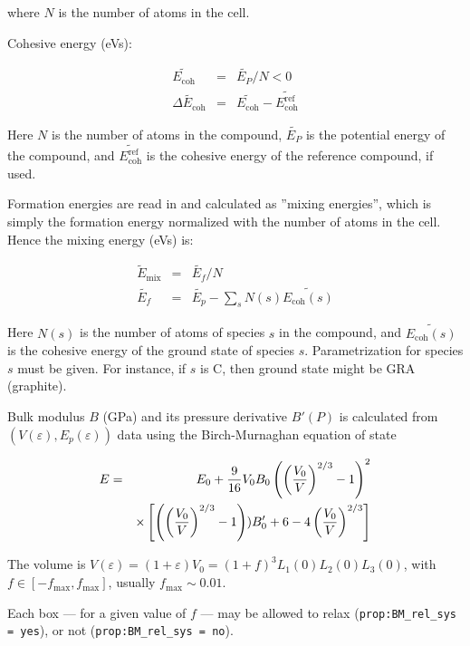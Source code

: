 \documentclass[a4paper,12pt,pdftex,onecolumn]{article}
\begin{document}
where $N$ is the number of atoms in the cell.

Cohesive energy (eVs):

\begin{eqnarray}
\widetilde{E_{\mathrm{coh}}} &=& \widetilde{E_P}/N < 0\\
\widetilde{\Delta E_{\mathrm{coh}}}
&=& \widetilde{E_{\mathrm{coh}}} - \widetilde{E_{\mathrm{coh}}^{\mathrm{ref}}}
\end{eqnarray}

Here $N$ is the number of atoms in the compound,
$\widetilde{E_P}$ is the potential energy of the compound, and
$\widetilde{E_{\mathrm{coh}}^{\mathrm{ref}}}$ is the cohesive energy of the reference
compound, if used.

Formation energies are read in and calculated as ''mixing energies'',
which is simply the formation energy normalized with the number of atoms
in the cell. Hence the mixing energy (eVs) is:

\begin{eqnarray}
\widetilde{E}_{\mathrm{mix}} &=& \widetilde{E_f}/N \\
\widetilde{E_f} &=& \widetilde{E_p} - \sum_s N(s) \widetilde{E_{\mathrm{coh}}(s)}
\end{eqnarray}

Here $N(s)$ is the number of atoms of species $s$ in the compound, and
$\widetilde{E_{\mathrm{coh}}(s)}$ is the cohesive energy of the ground state of species $s$.
Parametrization for species $s$ must be given.
For instance, if $s$ is C, then ground state might be GRA (graphite).


Bulk modulus $B$ (GPa) and its pressure derivative $B'(P)$ is calculated from
$(V(\varepsilon), E_p(\varepsilon))$ data using the
Birch-Murnaghan equation of state~\cite{Birch-PR71-1947,Mur44}

\begin{eqnarray}
E &=& E_0 + {9 \over 16} V_0 B_0 \left( \left({V_0 \over V}\right)^{2/3} - 1 \right)^2 \nonumber \\
  & & \times 
\left[
\left( \left({V_0 \over V}\right)^{2/3} - 1 \right)) B'_0
+ 6 - 4 \left({V_0 \over V}\right)^{2/3}
\right]
\end{eqnarray}

The volume is $V(\varepsilon) = (1 + \varepsilon) V_0
= (1+f)^3 L_1(0) L_2(0) L_3(0)$, with $f \in [-f_{\mathrm{max}}, f_{\mathrm{max}}]$, usually
$f_{\mathrm{max}} \sim 0.01$.

Each box --- for a given value of $f$ --- may be allowed to
relax (\verb+prop:BM_rel_sys = yes+),
or not (\verb+prop:BM_rel_sys = no+).
\end{document}
